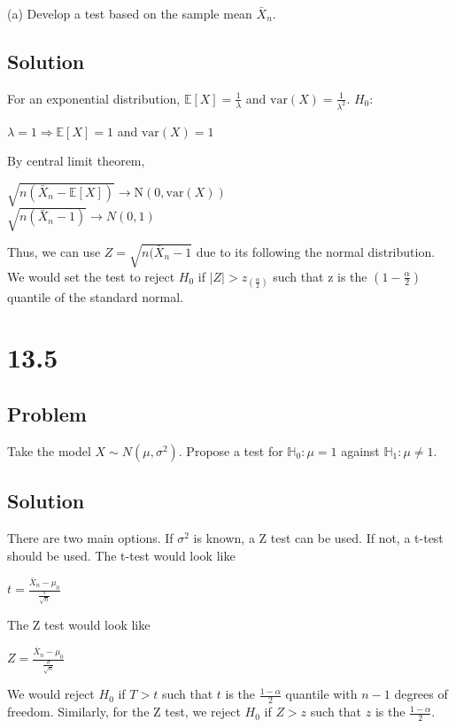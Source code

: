 \documentclass[10pt, a4paper]{article}
\newcommand{\EE}{\mathbb E}
\begin{document}
      (a) Develop a test based on the sample mean $\bar X_n$.
    \subsection*{Solution}
      For an exponential distribution, $\EE[X]=\frac{1}{\lambda}$ and $\text{var}(X)=\frac{1}{\lambda^2}$.
      $H_0$:
      \begin{center}
        $\lambda=1\Rightarrow \EE[X]=1$ and $\text{var}(X)=1$
      \end{center}
      By central limit theorem,
      \begin{center}
        $\sqrt{n(\bar{X}_n- \EE[X])}\rightarrow \text{N}(0,\text{var}(X))$ \\ 
        $\sqrt{n(\bar{X}_n-1)}\rightarrow N(0,1)$
      \end{center}
      Thus, we can use $Z = \sqrt{n(\bar{X}_n-1}$ due to its following the normal distribution. We would set the test to reject $H_0$ if $|Z|>z_{(\frac{\alpha}{2})}$ such that z is the $(1-\frac{\alpha}{2})$ quantile of the standard normal.
  \section*{13.5}
    \subsection*{Problem}
      Take the model $X\sim N(\mu,\sigma^2)$. Propose a test for $\mathbb{H}_0:\mu=1$ against $\mathbb{H}_1:\mu\ne1$. 
    \subsection*{Solution}
      There are two main options. If $\sigma^2$ is known, a Z test can be used. If not, a t-test should be used. The t-test would look like
      \begin{center}
        $t = \frac{\bar{X}_n-\mu_0}{\frac{s}{\sqrt{n}}}$  
      \end{center}
      The Z test would look like
      \begin{center}
        $Z = \frac{\bar{X}_n-\mu_0}{\frac{\sigma}{\sqrt{n}}}$
      \end{center}
      We would reject $H_0$ if $T>t$ such that $t$ is the $\frac{1-\alpha}{2}$ quantile with $n-1$ degrees of freedom. Similarly, for the Z test, we reject $H_0$ if $Z>z$ such that $z$ is the $\frac{1-\alpha}{2}$. 
\end{document}
